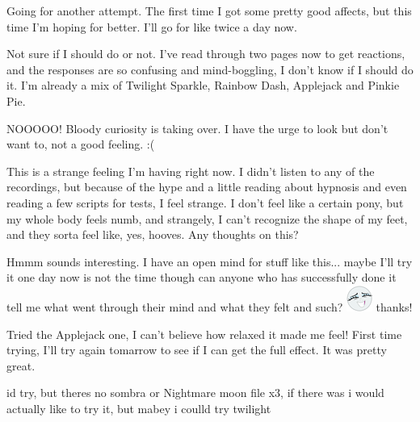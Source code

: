\documentclass[ebook,12pt,oneside,openany]{memoir}
\begin{document}
\begin{tcolorbox}[title=Admiral Colt]
\par{Going for another attempt. The first time I got some pretty good affects, but this time I'm hoping for better. I'll go for like twice a day now.}
\end{tcolorbox}
\begin{tcolorbox}[title=Opalicious,colback=violet!5!white,colframe=violet!75!black,coltitle=white]
\par{Not sure if I should do or not. I've read through two pages now to get reactions, and the responses are so confusing and mind-boggling, I don't know if I should do it. I'm already a mix of Twilight Sparkle, Rainbow Dash, Applejack and Pinkie Pie.}
\newline{}
\par{NOOOOO! Bloody curiosity is taking over. I have the urge to look but don't want to, not a good feeling. :(}
\newline{}
\par{This is a strange feeling I'm having right now. I didn't listen to any of the recordings, but because of the hype and a little reading about hypnosis and even reading a few scripts for tests, I feel strange. I don't feel like a certain pony, but my whole body feels numb, and strangely, I can't recognize the shape of my feet, and they sorta feel like, yes, hooves. Any thoughts on this?}
\end{tcolorbox}
\begin{tcolorbox}[title=Sanic Screwdriver]
\par{Hmmm sounds interesting. I have an open mind for stuff like this... maybe I'll try it one day now is not the time though can anyone who has successfully done it tell me what went through their mind and what they felt and such? \includegraphics{images/mlp_8pfRZzv.png} thanks!}
\end{tcolorbox}
\begin{tcolorbox}[title=Dusty Soul]
\par{Tried the Applejack one, I can't believe how relaxed it made me feel!  First time trying, I'll try again tomarrow to see if I can get the full effect.  It was pretty great.}
\end{tcolorbox}
\begin{tcolorbox}[title=Prince Midnight]
\par{id try, but theres no sombra or Nightmare moon file x3, if there was i would actually like to try it, but mabey i coulld try twilight}
\end{tcolorbox}
\end{document}
